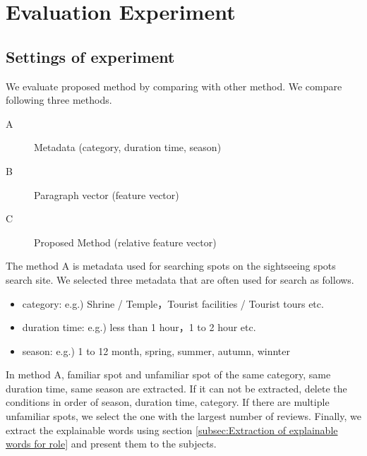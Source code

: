 \documentclass[journal]{IAENGtran}
\begin{document}
\section{Evaluation Experiment}
\label{sec:Evaluation Experiment}
\subsection{Settings of experiment}
\label{subsec:Settings of experiment}

We evaluate proposed method by comparing with other method.
We compare following three methods.
\begin{description}
\item[A]Metadata (category, duration time, season)
\item[B]Paragraph vector (feature vector)
\item[C]Proposed Method (relative feature vector)
\end{description}

The method A is metadata used for searching spots on the sightseeing spots search site.
We selected three metadata that are often used for search as follows.
\begin{itemize}
\item category: e.g.) Shrine / Temple，Tourist facilities / Tourist tours etc.
\item duration time: e.g.) less than 1 hour，1 to 2 hour etc.
\item season: e.g.) 1 to 12 month, spring, summer, autumn, winnter
\end{itemize}
In method A, familiar spot and unfamiliar spot of the same category, same duration time, same season are extracted. If it can not be extracted, delete the conditions in order of season, duration time, category.
If there are multiple unfamiliar spots, we select the one with the largest number of reviews.
Finally, we extract the explainable words using section \ref{subsec:Extraction of explainable words for role} and present them to the subjects.
\end{document}
